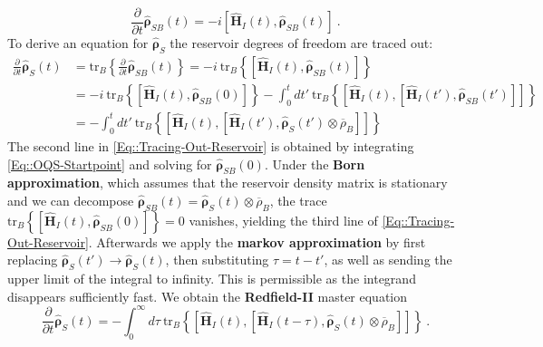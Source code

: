 		\begin{equation} \label{Eq::OQS-Startpoint}
			\frac{\partial}{\partial t}\boldsymbol{\hat{\rho}}_{SB}(t) =	- i \left[\boldsymbol{\hat{H}}_I(t), \boldsymbol{\hat{\rho}}_{SB}(t) \right] ~.
		\end{equation}
		To derive an equation for $\boldsymbol{\hat{\rho}}_S$ the reservoir degrees of freedom are traced out:
		\begin{equation} \label{Eq::Tracing-Out-Reservoir}
			\begin{split}
							\frac{\partial}{\partial t} \boldsymbol{\hat{\rho}}_S(t) &=	\text{tr}_B \left \lbrace \frac{\partial}{\partial t} \boldsymbol{\hat{\rho}}_{SB}(t) \right \rbrace =	-i~\text{tr}_B \left\lbrace \left[\boldsymbol{\hat{H}}_I(t), \boldsymbol{\hat{\rho}}_{SB}(t)\right] \right\rbrace  \\
							&=	-i~\text{tr}_B \left\lbrace \left[\boldsymbol{\hat{H}}_I(t), \boldsymbol{\hat{\rho}}_{SB}(0)\right] \right \rbrace - \int_{0}^{t} dt'~ \text{tr}_B \left\{  \left[\boldsymbol{\hat{H}}_I(t), \left[\boldsymbol{\hat{H}}_I(t'), \boldsymbol{\hat{\rho}}_{SB}(t') \right]\right]  \right\} \\
							&=- \int_{0}^{t} dt'~ \text{tr}_B \left\{  \left[\boldsymbol{\hat{H}}_I(t), \left[\boldsymbol{\hat{H}}_I(t'), \boldsymbol{\hat{\rho}}_S(t') \otimes \overline{\rho}_B \right]\right]  \right\}
			\end{split}
		\end{equation}
		The second line in \autoref{Eq::Tracing-Out-Reservoir} is obtained by integrating \autoref{Eq::OQS-Startpoint} and solving for $\boldsymbol{\hat{\rho}}_{SB}(0)$. Under the \textbf{Born approximation}, which assumes that the reservoir density matrix is stationary and we can decompose $\boldsymbol{\hat{\rho}}_{SB}(t) = \boldsymbol{\hat{\rho}}_S(t) \otimes \overline{\rho}_B$, the trace $\text{tr}_B \left\lbrace \left[\boldsymbol{\hat{H}}_I(t), \boldsymbol{\hat{\rho}}_{SB}(0)\right] \right \rbrace =	0$ vanishes, yielding the third line of \autoref{Eq::Tracing-Out-Reservoir}. Afterwards we apply the \textbf{markov approximation} \cite{landi2022nonequilibrium} by first replacing $\boldsymbol{\hat{\rho}}_S(t') \rightarrow \boldsymbol{\hat{\rho}}_S(t)$, then substituting $\tau =t - t'$, as well as sending the upper limit of the integral to infinity. This is permissible as the integrand disappears sufficiently fast. We obtain the \textbf{Redfield-II} master equation
		\begin{equation} \label{Eq::Redfield-II}
			\frac{\partial}{\partial t} \boldsymbol{\hat{\rho}}_S(t) = - \int_{0}^{\infty} d\tau~ \text{tr}_B \left\{  \left[\boldsymbol{\hat{H}}_I(t), \left[\boldsymbol{\hat{H}}_I(t - \tau), \boldsymbol{\hat{\rho}}_S(t) \otimes \overline{\rho}_B \right]\right]  \right\} ~.
		\end{equation}
